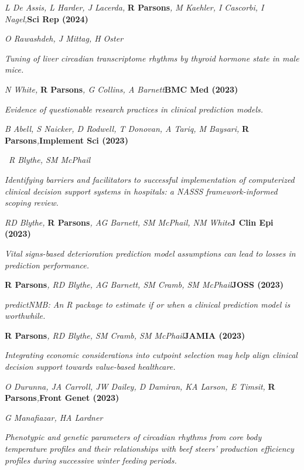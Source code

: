 \item
	\textit{L De Assis, L Harder, J Lacerda, }\textbf{R Parsons}\textit{, M Kaehler, I Cascorbi, I Nagel,}\textbf{\hfill{Sci Rep (2024)}}\par
	\textit{O Rawashdeh, J Mittag, H Oster}\par
    \textit{Tuning of liver circadian transcriptome rhythms by thyroid hormone state in male mice.}
\item
    \textit{N White, }\textbf{R Parsons}\textit{, G Collins, A Barnett}\textbf{\hfill{BMC Med (2023)}}\par
    \textit{Evidence of questionable research practices in clinical prediction models.}
\item
    \textit{B Abell, S Naicker, D Rodwell, T Donovan, A Tariq, M Baysari, }\textbf{R Parsons}\textit{,}\textbf{\hfill{Implement Sci (2023)}}\par\
	\textit{R Blythe, SM McPhail}\par
    \textit{Identifying barriers and facilitators to successful implementation of computerized clinical decision support systems in hospitals: a NASSS framework-informed scoping review.}
\item
    \textit{RD Blythe, }\textbf{R Parsons}\textit{, AG Barnett, SM McPhail, NM White}\textbf{\hfill{J Clin Epi (2023)}}\par
    \textit{Vital signs-based deterioration prediction model assumptions can lead to losses in prediction performance.}
\item
    \textbf{R Parsons}\textit{, RD Blythe, AG Barnett, SM Cramb, SM McPhail}\textbf{\hfill{JOSS (2023)}}\par
    \textit{predictNMB: An R package to estimate if or when a clinical prediction model is worthwhile.}
\item
    \textbf{R Parsons}\textit{, RD Blythe, SM Cramb, SM McPhail}\textbf{\hfill{JAMIA (2023)}}\par
    \textit{Integrating economic considerations into cutpoint selection may help align clinical decision support towards value-based healthcare.}
\item
    \textit{O Durunna, JA Carroll, JW Dailey, D Damiran, KA Larson, E Timsit, }\textbf{R Parsons}\textit{,}\textbf{\hfill{Front Genet (2023)}}\par
	\textit{G Manafiazar, HA Lardner}\par
    \textit{Phenotypic and genetic parameters of circadian rhythms from core body temperature profiles and their relationships with beef steers’ production efficiency profiles during successive winter feeding periods.}
